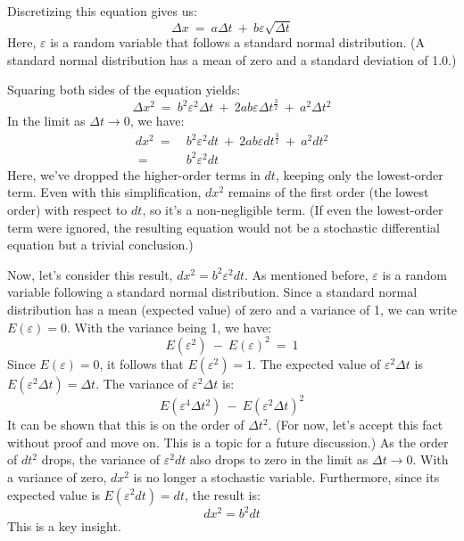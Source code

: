 \documentclass[uplatex,a4j,12pt,dvipdfmx]{jsarticle}
\begin{document}
Discretizing this equation gives us:
$$
	\Delta x
	\ = \
	a \Delta t
	\ + \
	b \varepsilon \sqrt{\Delta t}
$$
Here, $\varepsilon$ is a random variable that follows a standard normal distribution. (A standard normal distribution has a mean of zero and a standard deviation of 1.0.)

Squaring both sides of the equation yields:
$$
	\Delta x^{2}
	\ = \
	b^{2} \varepsilon^{2} \Delta t
	\ + \
	2 a b \varepsilon \Delta t^{\frac{3}{2}}
	\ + \
	a^{2} \Delta t^{2}
$$
In the limit as $\Delta t \to 0$, we have:
\begin{align}
	d x^{2}
	\ = & \
	b^{2} \varepsilon^{2} dt
	\ + \
	2 a b \varepsilon dt^{\frac{3}{2}}
	\ + \
	a^{2} d t^{2}
	\\
	\ = & \
	b^{2} \varepsilon^{2} dt
\end{align}
Here, we've dropped the higher-order terms in $dt$, keeping only the lowest-order term. Even with this simplification, $dx^{2}$ remains of the first order (the lowest order) with respect to $dt$, so it's a non-negligible term. (If even the lowest-order term were ignored, the resulting equation would not be a stochastic differential equation but a trivial conclusion.)

Now, let's consider this result, $dx^{2} = b^{2} \varepsilon^{2} dt$. As mentioned before, $\varepsilon$ is a random variable following a standard normal distribution. Since a standard normal distribution has a mean (expected value) of zero and a variance of 1, we can write $E(\varepsilon)=0$. With the variance being 1, we have:
$$
	E(\varepsilon^{2})
	\ - \
	E(\varepsilon)^{2}
	\ = \
	1
$$
Since $E(\varepsilon)=0$, it follows that $E(\varepsilon^{2})=1$.
The expected value of $\varepsilon^{2} \Delta t$ is $E(\varepsilon^{2} \Delta t) = \Delta t$.
The variance of $\varepsilon^{2} \Delta t$ is:
$$
	E(\varepsilon^{4} \Delta t^{2})
	\ - \
	E(\varepsilon^{2} \Delta t)^{2}
$$
It can be shown that this is on the order of $\Delta t^{2}$. (For now, let's accept this fact without proof and move on. This is a topic for a future discussion.) As the order of $d t^{2}$ drops, the variance of $\varepsilon^{2} d t$ also drops to zero in the limit as $\Delta t \to 0$. With a variance of zero, $dx^{2}$ is no longer a stochastic variable. Furthermore, since its expected value is $E(\varepsilon^{2} d t) = d t$, the result is:
$$
	dx^{2} = b^{2} dt
$$
This is a key insight.
\end{document}
